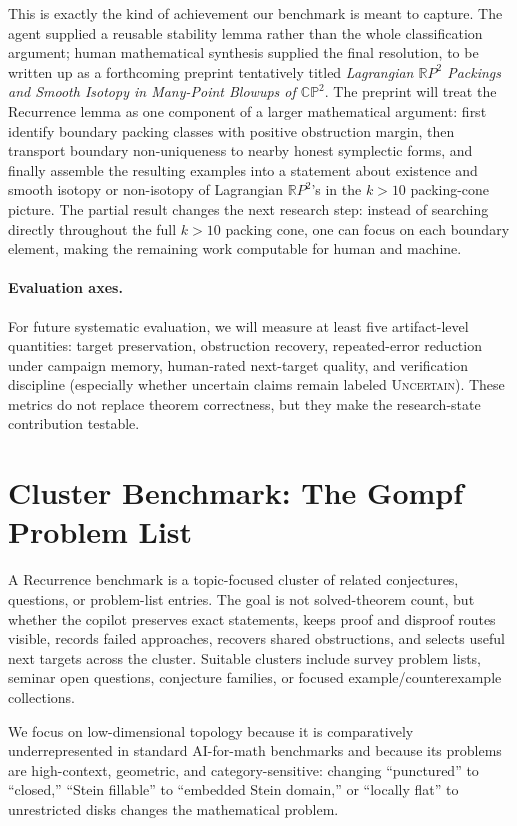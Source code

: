 \documentclass{article}
\theoremstyle{definition}
\theoremstyle{remark}
\begin{document}
This is exactly the kind of achievement our benchmark is meant to capture. The agent supplied a reusable stability lemma rather than the whole classification argument; human mathematical synthesis supplied the final resolution, to be written up as a forthcoming preprint tentatively titled \emph{Lagrangian \(\mathbb{R}P^2\) Packings and Smooth Isotopy in Many-Point Blowups of \(\mathbb{CP}^2\)}. The preprint will treat the Recurrence lemma as one component of a larger mathematical argument: first identify boundary packing classes with positive obstruction margin, then transport boundary non-uniqueness to nearby honest symplectic forms, and finally assemble the resulting examples into a statement about existence and smooth isotopy or non-isotopy of Lagrangian \(\mathbb{R}P^2\)'s in the \(k>10\) packing-cone picture. The partial result changes the next research step: instead of searching directly throughout the full \(k>10\) packing cone, one can focus on each boundary element, making the remaining work computable for human and machine.

\paragraph{Evaluation axes.}
For future systematic evaluation, we will measure at least five artifact-level quantities: target preservation, obstruction recovery, repeated-error reduction under campaign memory, human-rated next-target quality, and verification discipline (especially whether uncertain claims remain labeled \textsc{Uncertain}). These metrics do not replace theorem correctness, but they make the research-state contribution testable.

\section{Cluster Benchmark: The Gompf Problem List}
\label{sec:gompf}

A Recurrence benchmark is a topic-focused cluster of related conjectures, questions, or problem-list entries. The goal is not solved-theorem count, but whether the copilot preserves exact statements, keeps proof and disproof routes visible, records failed approaches, recovers shared obstructions, and selects useful next targets across the cluster. Suitable clusters include survey problem lists, seminar open questions, conjecture families, or focused example/counterexample collections.

We focus on low-dimensional topology because it is comparatively underrepresented in standard AI-for-math benchmarks and because its problems are high-context, geometric, and category-sensitive: changing ``punctured'' to ``closed,'' ``Stein fillable'' to ``embedded Stein domain,'' or ``locally flat'' to unrestricted disks changes the mathematical problem.
\end{document}
